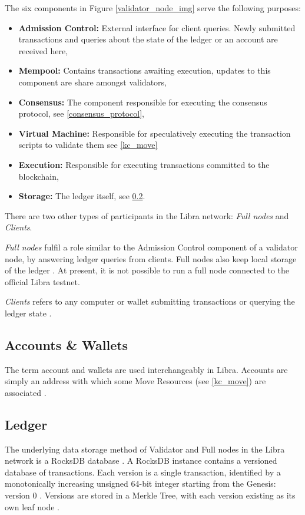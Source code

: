 \documentclass[12pt,openany,a4paper]{book}
\begin{document}
The six components in Figure \ref{validator_node_img} serve the following purposes:
\begin{itemize}
    \item \textbf{Admission Control:} External interface for client queries. 
    Newly submitted transactions and queries about the state of the ledger or an account are received here,
    \item \textbf{Mempool:} Contains transactions awaiting execution, updates to this component are
    share amongst validators,
    \item \textbf{Consensus:} The component responsible for executing the consensus protocol,
    see \ref{consensus_protocol},
    \item \textbf{Virtual Machine:} Responsible for speculatively executing the transaction scripts to validate them see \ref{kc_move}
    \item \textbf{Execution:} Responsible for executing transactions committed to the blockchain,
    \item \textbf{Storage:} The ledger itself, see \ref{kc_ledger}.
\end{itemize}

There are two other types of participants in the Libra network: \textit{Full nodes} and \textit{Clients}.

\textit{Full nodes} fulfil a role similar to the Admission Control component of a validator node, 
by answering ledger queries from clients. Full nodes also keep local storage of the 
ledger \cite{libra_full_nodes}. At present, it is not possible to run a full node 
connected to the official Libra testnet.

\textit{Clients} refers to any computer or wallet submitting transactions or querying the ledger state
\cite{libra_full_nodes}. 

\subsection{Accounts \& Wallets}
The term account and wallets are used interchangeably in Libra. Accounts are 
simply an address with which some Move Resources (see \ref{kc_move}) are 
associated \cite{libra_validator_node, libra_technical_paper}.

\subsection{Ledger}
\label{kc_ledger}
The underlying data storage method of Validator and Full nodes in the Libra 
network is a RocksDB database \cite{libra_storage}. A RocksDB instance 
contains a versioned database of transactions. Each version is a 
single transaction, identified by a monotonically 
increasing unsigned 64-bit integer starting from the Genesis: version 0 
\cite{libra_validator_node, libra_technical_paper, libra_smr}. Versions 
are stored in a Merkle Tree, with each version existing as its own leaf node
\cite{libra_technical_paper}.
\end{document}
